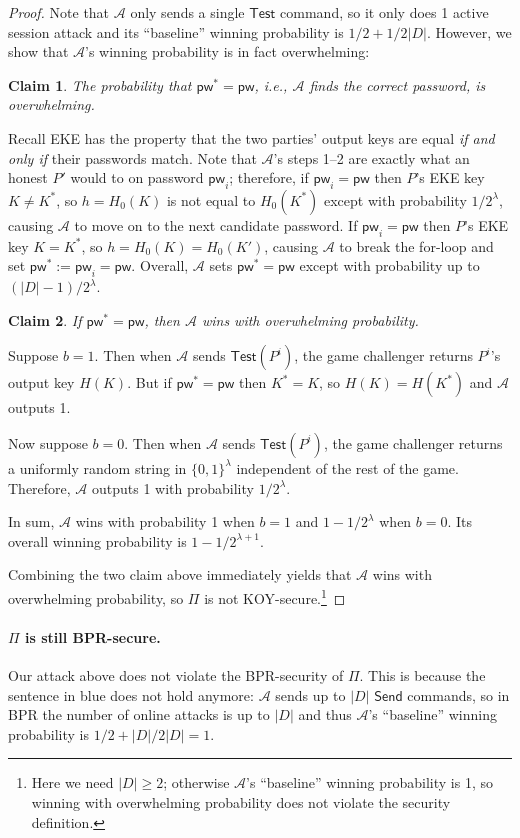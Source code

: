 \documentclass{article}
\newtheorem{claim}{Claim}
\newcommand{\adv}{\mathcal{A}}
\newcommand{\pw}{\mathsf{pw}}
\newcommand{\Send}{\mathsf{Send}}
\newcommand{\Test}{\mathsf{Test}}
\begin{document}
\begin{proof}
Note that {\color{blue}$\adv$ only sends a single $\Test$ command, so it only does 1 active session attack and its ``baseline'' winning probability is $1/2 + 1/2|D|$}. However, we show that $\adv$'s winning probability is in fact overwhelming:
\begin{claim}
The probability that $\pw^* = \pw$, i.e., $\adv$ finds the correct password, is overwhelming.
\end{claim}
Recall EKE has the property that the two parties' output keys are equal \emph{if and only if} their passwords match. Note that $\adv$'s steps 1--2 are exactly what an honest $P'$ would to on password $\pw_i$; therefore, if $\pw_i = \pw$ then $P$'s EKE key $K \neq K^*$, so $h = H_0(K)$ is not equal to $H_0(K^*)$ except with probability $1/2^\lambda$, causing $\adv$ to move on to the next candidate password. If $\pw_i = \pw$ then $P$'s EKE key $K = K^*$, so $h = H_0(K) = H_0(K')$, causing $\adv$ to break the for-loop and set $\pw^* := \pw_i = \pw$. Overall, $\adv$ sets $\pw^* = \pw$ except with probability up to $(|D|-1)/2^\lambda$.
\begin{claim}
If $\pw^* = \pw$, then $\adv$ wins with overwhelming probability.
\end{claim}
Suppose $b = 1$. Then when $\adv$ sends $\Test(P^i)$, the game challenger returns $P^i$'s output key $H(K)$. But if $\pw^* = \pw$ then $K^* = K$, so $H(K) = H(K^*)$ and $\adv$ outputs 1.

Now suppose $b = 0$. Then when $\adv$ sends $\Test(P^i)$, the game challenger returns a uniformly random string in $\{0,1\}^\lambda$ independent of the rest of the game. Therefore, $\adv$ outputs 1 with probability $1/2^\lambda$.

In sum, $\adv$ wins with probability 1 when $b = 1$ and $1-1/2^\lambda$ when $b = 0$. Its overall winning probability is $1-1/2^{\lambda+1}$.

\medskip
Combining the two claim above immediately yields that $\adv$ wins with overwhelming probability, so $\Pi$ is not KOY-secure.\footnote{Here we need $|D| \geq 2$; otherwise $\adv$'s ``baseline'' winning probability is 1, so winning with overwhelming probability does not violate the security definition.}
\end{proof}
\paragraph{$\Pi$ is still BPR-secure.}
Our attack above does not violate the BPR-security of $\Pi$. This is because the sentence in blue does not hold anymore: $\adv$ sends up to $|D|$ $\Send$ commands, so in BPR the number of online attacks is up to $|D|$ and thus $\adv$'s ``baseline'' winning probability is $1/2 + |D|/2|D| = 1$.
\end{document}
